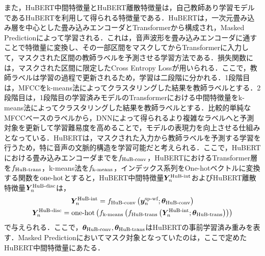 また，HuBERT中間特徴量とHuBERT離散特徴量は，自己教師あり学習モデルであるHuBERTを利用して得られる特徴量である．HuBERTは，一次元畳み込み層を中心とした畳み込みエンコーダとTransformerから構成され，Masked Predictionによって学習される．これは，音声波形を畳み込みエンコーダに通すことで特徴量に変換し、その一部区間をマスクしてからTransformerに入力して，マスクされた区間の教師ラベルを予測させる学習方法である．損失関数には，マスクされた区間に限定したCross Entropy Lossが用いられる．ここで，教師ラベルは学習の過程で更新されるため，学習は二段階に分かれる．1段階目は，MFCCをk-means法によってクラスタリングした結果を教師ラベルとする．2段階目は，1段階目の学習済みモデルのTransformerにおける中間特徴量をk-means法によってクラスタリングした結果を教師ラベルとする．比較的単純なMFCCベースのラベルから，DNNによって得られるより複雑なラベルへと予測対象を更新して学習難易度を高めることで，モデルの表現力を向上させる仕組みとなっている．HuBERTは，マスクされた入力から教師ラベルを予測する学習を行うため，特に音声の文脈的構造を学習可能だと考えられる．ここで，HuBERTにおける畳み込みエンコーダまでを$f_{\text{HuB-conv}}$，HuBERTにおけるTransformer層を$f_{\text{HuB-trans}}$，k-means法を$f_{\text{k-means}}$，インデックス系列をOne-hotベクトルに変換する関数を$\text{one-hot}$とすると，HuBERT中間特徴量$\bm{Y}^{\text{HuB-int}}_{n}$およびHuBERT離散特徴量$\bm{Y}^{\text{HuB-disc}}_{n}$は，
\begin{gather}
    \bm{Y}^{\text{HuB-int}}_{n} = f_{\text{HuB-conv}}\left(\bm{y}^{\text{sp-wf}}_{n}; \bm{\theta}_{\text{HuB-conv}}\right) \\
    \bm{Y}^{\text{HuB-disc}}_{n} = \text{one-hot}\left(f_{\text{k-means}}\left(f_{\text{HuB-trans}}\left(\bm{Y}^{\text{HuB-int}}_{n}; \bm{\theta}_{\text{HuB-trans}}\right)\right)\right)
\end{gather}
で与えられる．ここで，$\bm{\theta}_{\text{HuB-conv}}, \bm{\theta}_{\text{HuB-trans}}$はHuBERTの事前学習済み重みを表す．Masked Predictionにおいてマスク対象となっていたのは，ここで定めたHuBERT中間特徴量にあたる．

